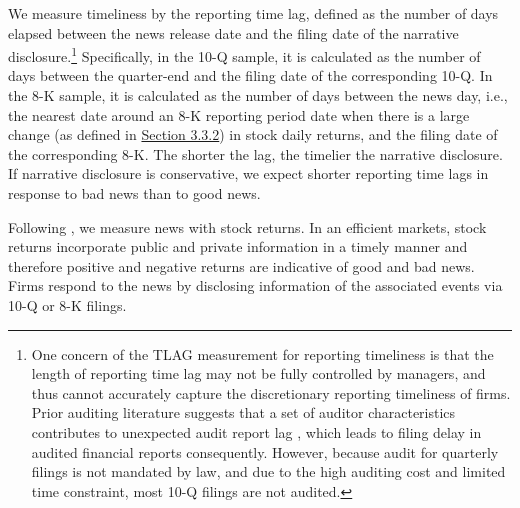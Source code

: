 \documentclass[letterpaper,12pt]{article}
\begin{document}
\begin{spacing}{1.5}
We measure timeliness by the reporting time lag, defined as the number of days elapsed between the news release date and the filing date of the narrative disclosure.\footnote{One concern of the TLAG measurement for reporting timeliness is that the length of reporting time lag may not be fully controlled by managers, and thus cannot accurately capture the discretionary reporting timeliness of firms. Prior auditing literature suggests that a set of auditor characteristics contributes to unexpected audit report lag \cite{knechelAdditionalEvidenceAudit2001, bamberAuditStructureOther1993}, which leads to filing delay in audited financial reports consequently. However, because audit for quarterly filings is not mandated by law, and due to the high auditing cost and limited time constraint, most 10-Q filings are not audited.} Specifically, in the 10-Q sample, it is calculated as the number of days between the quarter-end and the filing date of the corresponding 10-Q. In the 8-K sample, it is calculated as the number of days between the news day, i.e., the nearest date around an 8-K reporting period date when there is a large change (as defined in \hyperref[sec3.3.2]{Section 3.3.2}) in stock daily returns, and the filing date of the corresponding 8-K. The shorter the lag, the timelier the narrative disclosure. If narrative disclosure is conservative, we expect shorter reporting time lags in response to bad news than to good news.

Following , we measure news with stock returns. In an efficient markets, stock returns incorporate public and private information in a timely manner and therefore positive and negative returns are indicative of good and bad news. %
Firms respond to the news by disclosing information of the associated events via 10-Q or 8-K filings. 


\end{spacing}
\end{document}
